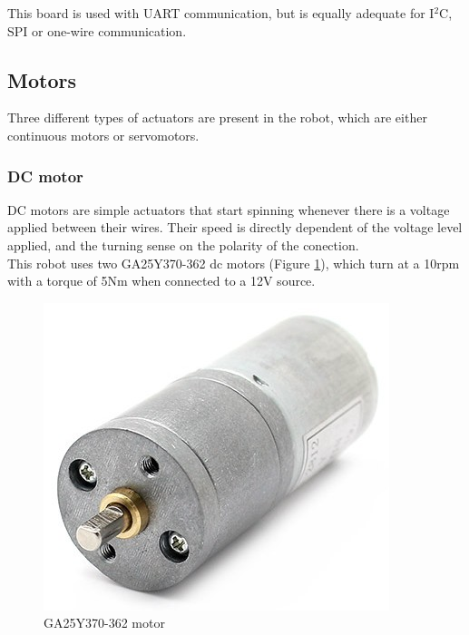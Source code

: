 		This board is used with UART communication, but is equally adequate for I$^2$C, SPI or one-wire communication.
 








\bigskip


\subsection{Motors}

Three different types of actuators are present in the robot, which are either continuous motors or servomotors.

	\subsubsection{DC motor}
	
	DC motors are simple actuators that start spinning whenever there is a voltage applied between their wires.  Their speed is directly dependent of the voltage level applied, and the turning sense on the polarity of the conection.\\

	This robot uses two GA25Y370-362 dc motors (Figure \ref{dc-motor}), which turn at a 10rpm with a torque of 5Nm when connected to a 12V source. 

		\begin{figure}[H]
			\centering
			\includegraphics[scale=0.4]{images/ProjectComponents/motor.jpg}
			\caption{GA25Y370-362 motor }
			\label{dc-motor}
		\end{figure}
		\bigskip

